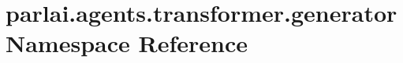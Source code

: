 \hypertarget{namespaceparlai_1_1agents_1_1transformer_1_1generator}{}\section{parlai.\+agents.\+transformer.\+generator Namespace Reference}
\label{namespaceparlai_1_1agents_1_1transformer_1_1generator}
